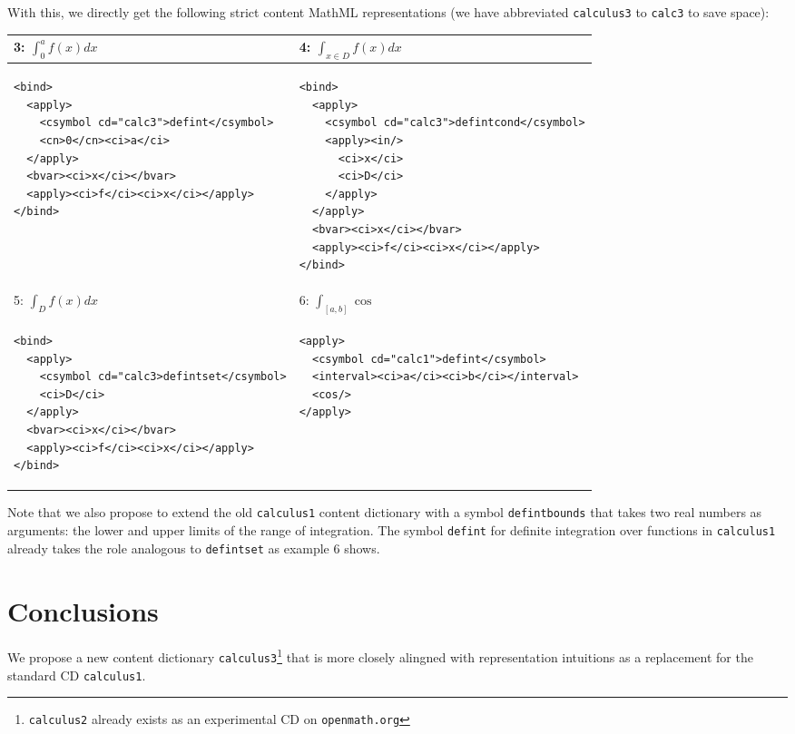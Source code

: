 \documentclass[12pt]{article}
\begin{document}
With this, we directly get the following strict content MathML representations (we have
abbreviated {\texttt{calculus3}} to {\texttt{calc3}} to save space):
\begin{center}\lstset{frame=none,numbers=none,lineskip=-.7ex,aboveskip=-.5em,belowskip=-1em,language=MathML}
\begin{tabular}{|p{7.5cm}|p{8cm}|}\hline
  3: $\int_0^af(x) dx$ & 4: $\int_{x\in D}f(x) dx$ \\\hline
\begin{lstlisting}
<bind>
  <apply>
    <csymbol cd="calc3">defint</csymbol>
    <cn>0</cn><ci>a</ci>
  </apply>
  <bvar><ci>x</ci></bvar>
  <apply><ci>f</ci><ci>x</ci></apply>
</bind>
\end{lstlisting}
&
\begin{lstlisting}
<bind>
  <apply>
    <csymbol cd="calc3">defintcond</csymbol>
    <apply><in/>
      <ci>x</ci>
      <ci>D</ci>
    </apply>
  </apply>
  <bvar><ci>x</ci></bvar>
  <apply><ci>f</ci><ci>x</ci></apply>
</bind>
\end{lstlisting}
\\\hline\hline
 5: $\int_Df(x)dx$ & 6: $\int_{[a,b]}\cos$\\\hline
\begin{lstlisting}
<bind>
  <apply>
    <csymbol cd="calc3>defintset</csymbol>
    <ci>D</ci>
  </apply>
  <bvar><ci>x</ci></bvar>
  <apply><ci>f</ci><ci>x</ci></apply>
</bind>
\end{lstlisting}
& 
\begin{lstlisting}
<apply>
  <csymbol cd="calc1">defint</csymbol>
  <interval><ci>a</ci><ci>b</ci></interval>
  <cos/>
</apply>
\end{lstlisting}
\\\hline
\end{tabular}
\end{center}

Note that we also propose to extend the old {\texttt{calculus1}} content dictionary with a
symbol {\texttt{defintbounds}} that takes two real numbers as arguments: the lower and
upper limits of the range of integration. The symbol {\texttt{defint}} for definite
integration over functions in {\texttt{calculus1}} already takes the role analogous to
{\texttt{{defintset}}} as example 6 shows. 

\section{Conclusions}

We propose a new content dictionary {\texttt{calculus3}}\footnote{{\texttt{calculus2}}
  already exists as an experimental CD on {\texttt{openmath.org}}} that is more closely
alingned with {} representation intuitions as a replacement for the {\openmath}
standard CD {\texttt{calculus1}}.
\end{document}
